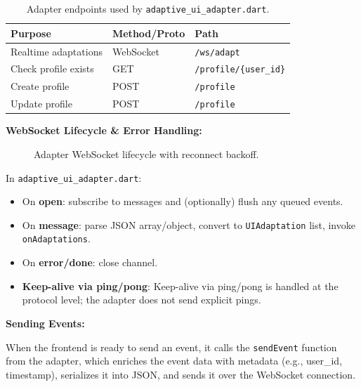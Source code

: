\documentclass[openany]{book}
\begin{document}
\begin{table}[H]
\centering
\caption{Adapter endpoints used by \texttt{adaptive\_ui\_adapter.dart}.}
\begin{tabular}{lll}
\toprule
Purpose & Method/Proto & Path \\
\midrule
Realtime adaptations & WebSocket & \verb|/ws/adapt| \\
Check profile exists & GET & \verb|/profile/{user_id}| \\
Create profile       & POST & \verb|/profile| \\
Update profile       & POST  & \verb|/profile| \\
\bottomrule
\end{tabular}
\label{tab:adapter_endpoints}
\end{table}
\newpage
\textbf{WebSocket Lifecycle \& Error Handling:}
\begin{figure}[H]
\centering
{}
\caption{Adapter WebSocket lifecycle with reconnect backoff.}
\end{figure}

\noindent In \texttt{adaptive\_ui\_adapter.dart}:
\begin{itemize}
  \item On \textbf{open}: subscribe to messages and (optionally) flush any queued events.
  \item On \textbf{message}: parse JSON array/object, convert to \texttt{UIAdaptation} list, invoke \texttt{onAdaptations}.
  \item On \textbf{error/done}: close channel.
  \item \textbf{Keep-alive via ping/pong}: Keep-alive via ping/pong is handled at the protocol level; the adapter does not send explicit pings.
\end{itemize}

\textbf{Sending Events:}

When the frontend is ready to send an event, it calls the \texttt{sendEvent} function from the adapter, which enriches the event data with metadata (e.g., user\_id, timestamp), serializes it into JSON, and sends it over the WebSocket connection. 
\end{document}
